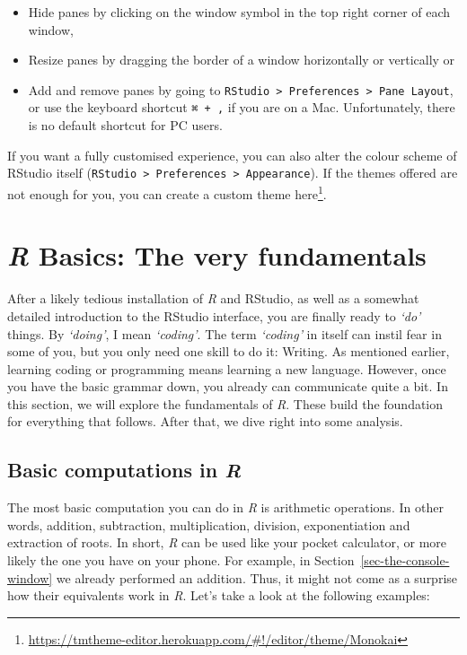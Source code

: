 \documentclass[
  letterpaper,
]{krantz}
\renewcommand{\href}[2]{#2\footnote{\url{#1}}}
\begin{document}
\begin{itemize}
\item
  Hide panes by clicking on the window symbol in the top right corner of
  each window,
\item
  Resize panes by dragging the border of a window horizontally or
  vertically or
\item
  Add and remove panes by going to
  \texttt{RStudio\ \textgreater{}\ Preferences\ \textgreater{}\ Pane\ Layout},
  or use the keyboard shortcut \texttt{⌘\ +\ ,} if you are on a Mac.
  Unfortunately, there is no default shortcut for PC users.
\end{itemize}

If you want a fully customised experience, you can also alter the colour
scheme of RStudio itself
(\texttt{RStudio\ \textgreater{}\ Preferences\ \textgreater{}\ Appearance}).
If the themes offered are not enough for you, you can create a custom
theme
\href{https://tmtheme-editor.herokuapp.com/\#!/editor/theme/Monokai}{here}.


\chapter{\texorpdfstring{\emph{R} Basics: The very
fundamentals}{R Basics: The very fundamentals}}\label{sec-r-basics-the-very-fundamentals}

After a likely tedious installation of \emph{R} and RStudio, as well as
a somewhat detailed introduction to the RStudio interface, you are
finally ready to \emph{`do'} things. By \emph{`doing'}, I mean
\emph{`coding'}. The term \emph{`coding'} in itself can instil fear in
some of you, but you only need one skill to do it: Writing. As mentioned
earlier, learning coding or programming means learning a new language.
However, once you have the basic grammar down, you already can
communicate quite a bit. In this section, we will explore the
fundamentals of \emph{R}. These build the foundation for everything that
follows. After that, we dive right into some analysis.

\section{\texorpdfstring{Basic computations in
\emph{R}}{Basic computations in R}}\label{sec-basic-computations-in-r}

The most basic computation you can do in \emph{R} is arithmetic
operations. In other words, addition, subtraction, multiplication,
division, exponentiation and extraction of roots. In short, \emph{R} can
be used like your pocket calculator, or more likely the one you have on
your phone. For example, in Section~\ref{sec-the-console-window} we
already performed an addition. Thus, it might not come as a surprise how
their equivalents work in \emph{R}. Let's take a look at the following
examples:
\end{document}

